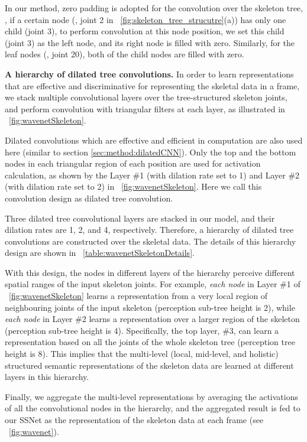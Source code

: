 \documentclass[10pt,twocolumn,letterpaper]{article}
\begin{document}
In our method,
zero padding is adopted for the convolution over the skeleton tree,
\ie, if a certain node (\eg, joint 2 in \figurename{~\ref{fig:skeleton_tree_strucutre}(a)}) has only one child (joint 3),
to perform convolution at this node position,
we set this child (joint 3) as the left node, and its right node is filled with zero.
Similarly, for the leaf nodes (\eg, joint 20), both of the child nodes are filled with zero.


\textbf{A hierarchy of dilated tree convolutions.}
In order to learn representations that are effective and discriminative for representing the skeletal data in a frame,
we stack multiple convolutional layers over the tree-structured skeleton joints,
and perform convolution with triangular filters at each layer,
as illustrated in \figurename{~\ref{fig:wavenetSkeleton}}.

Dilated convolutions which are effective and efficient in computation are also used here (similar to section \ref{sec:method:dilatedCNN}).
Only the top and the bottom nodes in each triangular region of each position are used for activation calculation,
as shown by the Layer \#1 (with dilation rate set to 1) and Layer \#2 (with dilation rate set to 2) in \figurename{~\ref{fig:wavenetSkeleton}}.
Here we call this convolution design as dilated tree convolution.

Three dilated tree convolutional layers are stacked in our model,
and their dilation rates are 1, 2, and 4, respectively.
Therefore, a hierarchy of dilated tree convolutions are constructed over the skeletal data.
The details of this hierarchy design are shown in \tablename{~\ref{table:wavenetSkeletonDetails}}.

With this design,
the nodes in different layers of the hierarchy perceive different spatial ranges of the input skeleton joints.
For example, \emph{each node} in Layer \#1 of \figurename{~\ref{fig:wavenetSkeleton}} learns a representation from a very local region of neighbouring joints of the input skeleton
(perception sub-tree height is 2),
while \emph{each node} in Layer \#2 learns a representation over a larger region of the skeleton
(perception sub-tree height is 4).
Specifically,
the top layer, \#3, can learn a representation based on all the joints of the whole skeleton tree
(perception tree height is 8).
This implies that the multi-level (local, mid-level, and holistic) structured semantic representations of the skeleton data are learned at different layers in this hierarchy.

Finally, we aggregate the multi-level representations by averaging the activations of all the convolutional nodes in the hierarchy,
and the aggregated result is fed to our SSNet as the representation of the skeleton data at each frame (see \figurename{~\ref{fig:wavenet}}).
\end{document}
